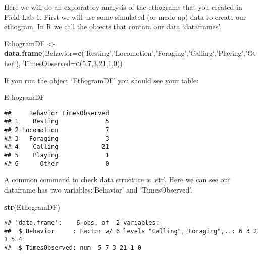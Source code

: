 \documentclass[]{book}
\newenvironment{Shaded}{\begin{snugshade}}{\end{snugshade}}
\newcommand{\DataTypeTok}[1]{\textcolor[rgb]{0.13,0.29,0.53}{#1}}
\newcommand{\DecValTok}[1]{\textcolor[rgb]{0.00,0.00,0.81}{#1}}
\newcommand{\KeywordTok}[1]{\textcolor[rgb]{0.13,0.29,0.53}{\textbf{#1}}}
\newcommand{\NormalTok}[1]{#1}
\newcommand{\StringTok}[1]{\textcolor[rgb]{0.31,0.60,0.02}{#1}}
\begin{document}
Here we will do an exploratory analysis of the ethograms that you created in Field Lab 1.
First we will use some simulated (or made up) data to create our ethogram. In R we call the objects that contain our data `dataframes'.

\begin{Shaded}
\begin{Highlighting}[]
\NormalTok{EthogramDF <-}\StringTok{ }
\StringTok{  }\KeywordTok{data.frame}\NormalTok{(}\DataTypeTok{Behavior=}\KeywordTok{c}\NormalTok{(}\StringTok{'Resting'}\NormalTok{,}\StringTok{'Locomotion'}\NormalTok{,}\StringTok{'Foraging'}\NormalTok{,}\StringTok{'Calling'}\NormalTok{,}\StringTok{'Playing'}\NormalTok{,}\StringTok{'Other'}\NormalTok{),}
                 \DataTypeTok{TimesObserved=}\KeywordTok{c}\NormalTok{(}\DecValTok{5}\NormalTok{,}\DecValTok{7}\NormalTok{,}\DecValTok{3}\NormalTok{,}\DecValTok{21}\NormalTok{,}\DecValTok{1}\NormalTok{,}\DecValTok{0}\NormalTok{))}
\end{Highlighting}
\end{Shaded}

If you run the object `EthogramDF' you should see your table:

\begin{Shaded}
\begin{Highlighting}[]
\NormalTok{EthogramDF}
\end{Highlighting}
\end{Shaded}

\begin{verbatim}
##     Behavior TimesObserved
## 1    Resting             5
## 2 Locomotion             7
## 3   Foraging             3
## 4    Calling            21
## 5    Playing             1
## 6      Other             0
\end{verbatim}

A common command to check data structure is `str'. Here we can see our dataframe has two variables:`Behavior' and `TimesObserved'.

\begin{Shaded}
\begin{Highlighting}[]
\KeywordTok{str}\NormalTok{(EthogramDF)}
\end{Highlighting}
\end{Shaded}

\begin{verbatim}
## 'data.frame':    6 obs. of  2 variables:
##  $ Behavior     : Factor w/ 6 levels "Calling","Foraging",..: 6 3 2 1 5 4
##  $ TimesObserved: num  5 7 3 21 1 0
\end{verbatim}
\end{document}

